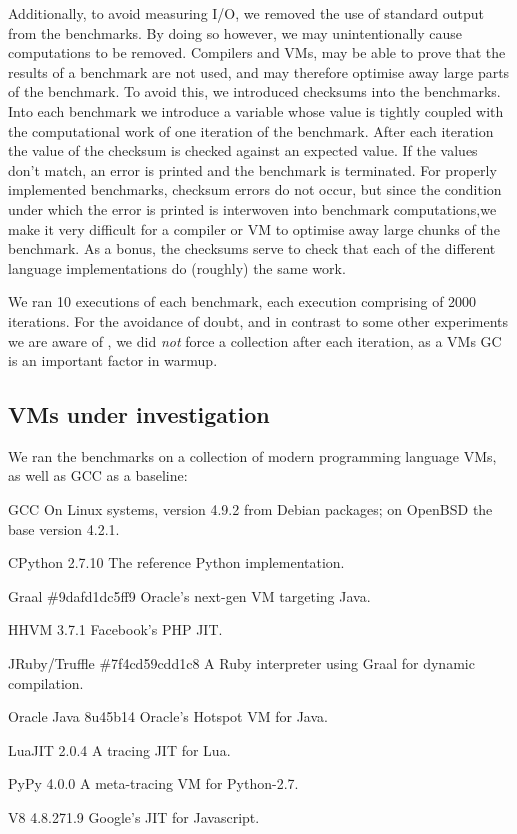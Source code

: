 \documentclass[10pt,preprint]{sigplanconf}
\begin{document}
Additionally, to avoid measuring I/O, we removed the use of standard output
from
the benchmarks. By doing so however, we may unintentionally cause computations
to be removed. Compilers and VMs, may be able to prove that the
results of a benchmark are not used, and may therefore optimise away large
parts of the benchmark. To avoid this, we introduced checksums into the
benchmarks. Into each benchmark we introduce a variable whose value is tightly
coupled with the computational work of one iteration of the benchmark. After
each iteration the value
of the checksum is checked against an expected value. If the values don't
match, an error is printed and the benchmark is terminated. For properly
implemented benchmarks, checksum errors do not occur, but since the condition
under which the error is printed is interwoven into benchmark computations,we
make it very difficult for a compiler or VM to optimise away large chunks of
the benchmark. As a bonus, the checksums serve to check that each of the
different language implementations do (roughly) the same work.

We ran 10 executions of each benchmark, each execution comprising of 2000
iterations. For the avoidance of doubt, and in
contrast to some other experiments we are aware of , we did
\emph{not} force a collection after each iteration, as a VMs GC is an important
factor in warmup.


\subsection{VMs under investigation}

We ran the benchmarks on a collection of modern programming language VMs,
as well as GCC as a baseline:
\begin{description*}
\item[GCC] On Linux systems, version 4.9.2 from Debian packages; on OpenBSD the base version 4.2.1.
\item[CPython 2.7.10] The reference Python implementation.
\item[Graal \#9dafd1dc5ff9] Oracle's next-gen VM targeting Java.
\item[HHVM 3.7.1] Facebook's PHP JIT.
\item[JRuby/Truffle \#7f4cd59cdd1c8] A Ruby interpreter using Graal for dynamic compilation.
\item[Oracle Java 8u45b14] Oracle's Hotspot VM for Java.
\item[LuaJIT 2.0.4] A tracing JIT for Lua.
\item[PyPy 4.0.0] A meta-tracing VM for Python-2.7.
\item[V8 4.8.271.9] Google's JIT for Javascript.
\end{description*}
\end{document}
